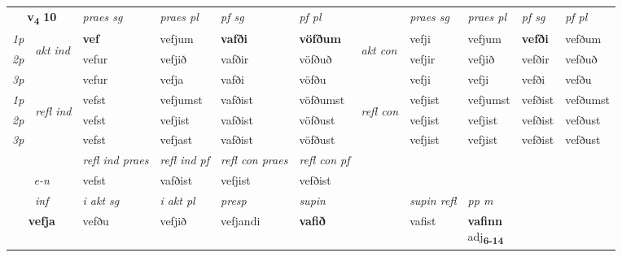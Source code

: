 \noindent
\begin{tabular}{lllllllllll} \toprule
\multicolumn{2}{c}{\textbf{v{\textsubscript{4}}} \Large{\textbf{10}}}  &  \textit{praes sg}  & \textit{praes pl}  &\textit{ pf sg} & \textit{pf pl} &  &  \textit{praes sg}  & \textit{praes pl}  & \textit{pf sg} & \textit{pf pl } \\*
	\cmidrule{3-6} \cmidrule{8-11}
 {\textit{1p}} & \multirow{3}{*}{\begin{turn}{90}\textit{akt ind}\end{turn}} & \textbf{vef} & vefjum & \textbf{vafði} & \textbf{vöfðum} & \multirow{3}{*}{\begin{turn}{90}\textit{akt con}\end{turn}} &vefji & vefjum & \textbf{vefði} & vefðum\\*
 {\textit{2p}} &  &  vefur  & vefjið & vafðir & vöfðuð & & vefjir & vefjið & vefðir & vefðuð \\*
{\textit{3p}} &  & vefur & vefja & vafði & vöfðu & & vefji & vefji& vefði & vefðu \\*
\cmidrule{3-6} \cmidrule{8-11}
 {\textit{1p}} & \multirow{3}{*}{\begin{turn}{90}\textit{refl ind}\end{turn}}  & vefst & vefjumst & vafðist & vöfðumst & \multirow{3}{*}{\begin{turn}{90}\textit{refl con}\end{turn}}  &vefjist & vefjumst & vefðist & vefðumst \\*
 {\textit{2p}} &  & vefst & vefjist & vafðist & vöfðust & &vefjist & vefjist & vefðist & vefðust \\*
 {\textit{3p}}  & & vefst & vefjast & vafðist & vöfðust & & vefjist & vefjist& vefðist & vefðust \\*
\cmidrule{3-6} \cmidrule{8-11}

 & & \textit{refl ind praes} & \textit{refl ind pf} & \textit{refl con praes} & \textit{refl con pf} \\*
 \multicolumn{2}{c}{ \textit{e-n} }& vefst & vafðist & vefjist & vefðist \\*

\cmidrule{3-9}
   \multicolumn{2}{c}{\textit{inf}}  & \textit{i akt sg} & \textit{i akt pl}   & \textit{presp} & \textit{supin} && \textit{supin refl} & \textit{pp m} \\*
  \multicolumn{2}{c}{\textbf{vefja}} & vefðu  & vefjið   & vefjandi &  \textbf{vafið} && vafist & \specialcell{\textbf{vafinn} \\ adj\textbf{\textsubscript{6-14}}} \\*
\end{tabular}


